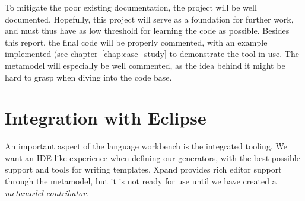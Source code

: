 To mitigate the poor existing documentation, the project will be well documented. Hopefully, this project will serve as a foundation for further work, and must thus have as low threshold for learning the code as possible. Besides this report, the final code will be properly commented, with an example implemented (see chapter~\ref{chap:case_study} to demonstrate the tool in use. The metamodel will especially be well commented, as the idea behind it might be hard to grasp when diving into the code base.

\section{Integration with Eclipse}
An important aspect of the language workbench is the integrated tooling. We want an IDE like experience when defining our generators, with the best possible support and tools for writing templates. Xpand provides rich editor support through the metamodel, but it is not ready for use until we have created a \emph{metamodel contributor}.

